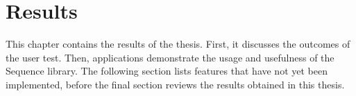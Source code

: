 \chapter{Results}
This chapter contains the results of the thesis. First, it discusses the
outcomes of the user test. Then, applications demonstrate the usage and
usefulness of the Sequence library. The following section lists features that
have not yet been implemented, before the final section reviews the results
obtained in this thesis. 




